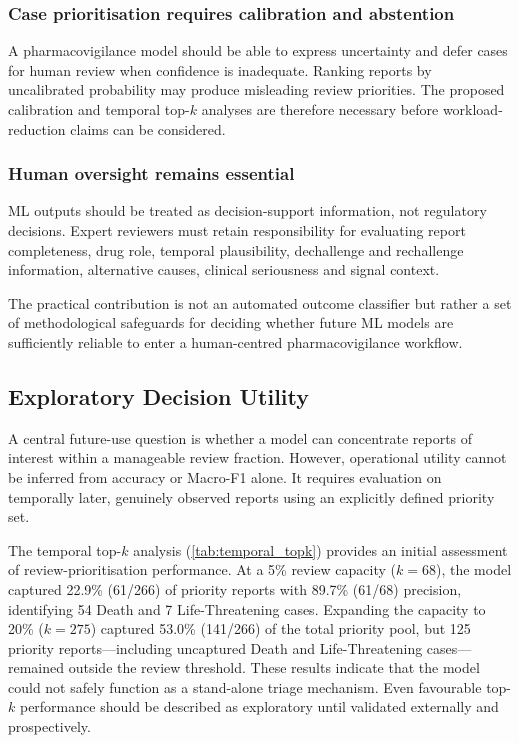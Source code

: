 \documentclass[10pt]{article}
\begin{document}
\subsubsection{Case prioritisation requires calibration and abstention}
A pharmacovigilance model should be able to express uncertainty and defer cases for human review when confidence is inadequate. Ranking reports by uncalibrated probability may produce misleading review priorities. The proposed calibration and temporal top-$k$ analyses are therefore necessary before workload-reduction claims can be considered.

\subsubsection{Human oversight remains essential}
ML outputs should be treated as decision-support information, not regulatory decisions. Expert reviewers must retain responsibility for evaluating report completeness, drug role, temporal plausibility, dechallenge and rechallenge information, alternative causes, clinical seriousness and signal context.

The practical contribution is not an automated outcome classifier but rather a set of methodological safeguards for deciding whether future ML models are sufficiently reliable to enter a human-centred pharmacovigilance workflow.

\subsection{Exploratory Decision Utility}
A central future-use question is whether a model can concentrate reports of interest within a manageable review fraction. However, operational utility cannot be inferred from accuracy or Macro-F1 alone. It requires evaluation on temporally later, genuinely observed reports using an explicitly defined priority set.

The temporal top-$k$ analysis (\cref{tab:temporal_topk}) provides an initial assessment of review-prioritisation performance. At a 5\% review capacity ($k{=}68$), the model captured 22.9\% (61/266) of priority reports with 89.7\% (61/68) precision, identifying 54 Death and 7 Life-Threatening cases. Expanding the capacity to 20\% ($k{=}275$) captured 53.0\% (141/266) of the total priority pool, but 125 priority reports---including uncaptured Death and Life-Threatening cases---remained outside the review threshold. These results indicate that the model could not safely function as a stand-alone triage mechanism. Even favourable top-$k$ performance should be described as exploratory until validated externally and prospectively.
\end{document}
